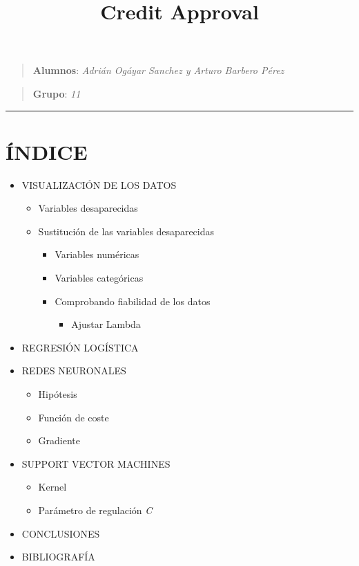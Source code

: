\documentclass[11pt]{article}
\title{Credit Approval}
\providecommand{\tightlist}{%
      \setlength{\itemsep}{0pt}\setlength{\parskip}{0pt}}
\begin{document}
    
    
    \maketitle
    
    

    
    \begin{quote}
\textbf{Alumnos}: \emph{Adrián Ogáyar Sanchez y Arturo Barbero Pérez}
\end{quote}

\begin{quote}
\textbf{Grupo}: \emph{11}
\end{quote}

\begin{center}\rule{0.5\linewidth}{\linethickness}\end{center}

    \section{ÍNDICE}\label{uxedndice}

\begin{itemize}
\item
  VISUALIZACIÓN DE LOS DATOS

  \begin{itemize}
  \item
    Variables desaparecidas
  \item
    Sustitución de las variables desaparecidas

    \begin{itemize}
    \tightlist
    \item
      Variables numéricas
    \item
      Variables categóricas
    \item
      Comprobando fiabilidad de los datos

      \begin{itemize}
      \tightlist
      \item
        Ajustar Lambda
      \end{itemize}
    \end{itemize}
  \end{itemize}
\item
  REGRESIÓN LOGÍSTICA
\item
  REDES NEURONALES

  \begin{itemize}
  \tightlist
  \item
    Hipótesis
  \item
    Función de coste
  \item
    Gradiente
  \end{itemize}
\item
  SUPPORT VECTOR MACHINES

  \begin{itemize}
  \tightlist
  \item
    Kernel
  \item
    Parámetro de regulación \emph{C}
  \end{itemize}
\item
  CONCLUSIONES
\item
  BIBLIOGRAFÍA
\end{itemize}
\end{document}
